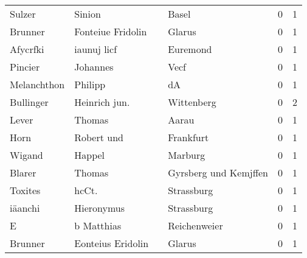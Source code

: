 \begin{center}
\begin{tiny}
\begin{longtabu}{llllrr}
                   Sulzer &                             Sinion &             &                                       Basel &          0 &         1 \\
                  Brunner &                  Fonteiue Fridolin &             &                                      Glarus &          0 &         1 \\
                 Afycrfki &                        iaunuj licf &             &                                    Euremond &          0 &         1 \\
                  Pincier &                           Johannes &             &                                        Vecf &          0 &         1 \\
              Melanchthon &                            Philipp &             &                                          dA &          0 &         1 \\
                Bullinger &                      Heinrich jun. &             &                                  Wittenberg &          0 &         2 \\
                    Lever &                             Thomas &             &                                       Aarau &          0 &         1 \\
                     Horn &                         Robert und &             &                                   Frankfurt &          0 &         1 \\
                   Wigand &                             Happel &             &                                     Marburg &          0 &         1 \\
                   Blarer &                             Thomas &             &                       Gyrsberg und Kemjffen &          0 &         1 \\
                  Toxites &                              hcCt. &             &                                  Strassburg &          0 &         1 \\
                  iäanchi &                         Hieronymus &             &                                  Strassburg &          0 &         1 \\
                        E &                         b Matthias &             &                                Reichenweier &          0 &         1 \\
                  Brunner &                  Eonteius Eridolin &             &                                      Glarus &          0 &         1 \\

\end{longtabu}
\end{tiny}
\end{center}
